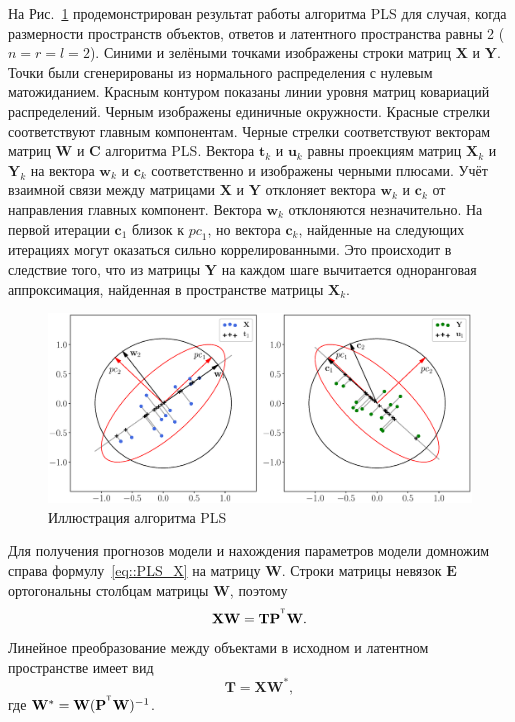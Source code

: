 \documentclass[12pt,twoside]{article}
\newcommand{\bw}{\mathbf{w}}
\newcommand{\bY}{\mathbf{Y}}
\newcommand{\bX}{\mathbf{X}}
\newcommand{\bu}{\mathbf{u}}
\newcommand{\bt}{\mathbf{t}}
\newcommand{\bc}{\mathbf{c}}
\newcommand{\bP}{\mathbf{P}}
\newcommand{\bT}{\mathbf{T}}
\newcommand{\bC}{\mathbf{C}}
\newcommand{\bE}{\mathbf{E}}
\newcommand{\bW}{\mathbf{W}}
\newcommand{\T}{^{\text{\tiny\sffamily\upshape\mdseries T}}}
\begin{document}
На Рис.~\ref{fig::PLSFigure} продемонстрирован результат работы алгоритма PLS для случая, когда размерности пространств объектов, ответов и латентного пространства равны 2 ($n = r = l = 2$).
Синими и зелёными точками изображены строки матриц $\bX$ и $\bY$. 
Точки были сгенерированы из нормального распределения с нулевым матожиданием. 
Красным контуром показаны линии уровня матриц ковариаций распределений. 
Черным изображены единичные окружности. 
Красные стрелки соответствуют главным компонентам. 
Черные стрелки соответствуют векторам матриц $\bW$ и $\bC$ алгоритма PLS. 
Вектора $\bt_k$ и $\bu_k$ равны проекциям матриц $\bX_k$ и $\bY_k$ на вектора $\bw_k$ и $\bc_k$ соответственно и изображены черными плюсами. 
Учёт взаимной связи между матрицами $\bX$ и $\bY$ отклоняет вектора $\bw_k$ и $\bc_k$ от направления главных компонент. 
Вектора $\bw_k$ отклоняются незначительно. 
На первой итерации $\bc_1$ близок к $\textit{pc}_1$, но вектора $\bc_k$, найденные на следующих итерациях могут оказаться сильно коррелированными. Это происходит в следствие того, что из матрицы $\bY$ на каждом шаге вычитается одноранговая аппроксимация, найденная в пространстве матрицы $\bX_k$.
\begin{figure}[h]
	\centering
	\includegraphics[width=\linewidth]{figs/PLSFigure.eps}
	\caption{Иллюстрация алгоритма PLS}
	\label{fig::PLSFigure}
\end{figure}

Для получения прогнозов модели и нахождения параметров модели 
домножим справа формулу~\eqref{eq::PLS_X} на матрицу $\bW$. Строки матрицы невязок $\bE$ ортогональны столбцам матрицы $\bW$, поэтому 
\[
	\bX \bW = \bT \bP^{\T} \bW.
\] 
Линейное преобразование между объектами в исходном и латентном пространстве имеет вид
\begin{equation}
	\bT = \bX \bW^*,
	\label{eq::W*}
\end{equation}
где $\bW^* = \bW (\bP^{\T} \bW)^{-1}$. 
\end{document}
